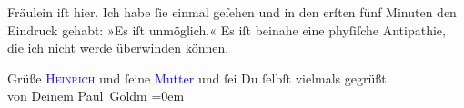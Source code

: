 \pstart
           Fräulein \label{K_L03230-223v}\label{K_L03230-223h} iſt hier. Ich habe ſie
               einmal geſehen und in den erſten fünf Minuten den Eindruck gehabt: »Es iſt
               unmöglich.« Es iſt beinahe eine phyſiſche Antipathie, die ich nicht werde überwinden
               können.\pend
           
\pstart
           Grüße \textsc{\textcolor{blue}{Heinrich}{}\ledrightnote{\textcolor{blue}{Heinrich Schnitzler}}} und ſeine \textcolor{blue}{Mutter}{}\ledrightnote{{$\rightarrow$}\textcolor{blue}{Olga Schnitzler}} und
               ſei Du ſelbſt vielmals gegrüßt {\\[\baselineskip]}von Deinem \spacefill\mbox{Paul Goldm}\pend
           \leftskip=0em{}\endnumbering{}
\begin{anhang}
\end{anhang}
      